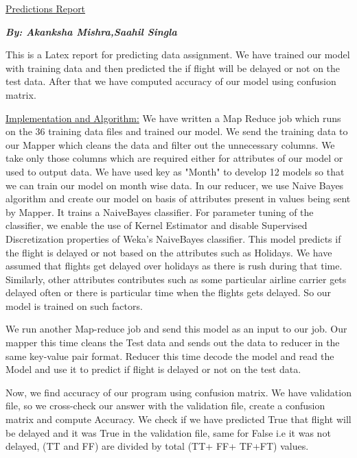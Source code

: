 \documentclass{article}
\begin{document}
\Huge
\begin{center}
\underline{Predictions Report} 
\end{center}
\vspace{1.2cm}
\textbf{\textit{
\huge{
By: 
Akanksha Mishra,Saahil Singla
}
}}

\Large{
This is a Latex report for predicting data assignment. We have trained our model with training data and then predicted the if flight will be delayed or not on the test data. After that we have computed accuracy of our model using confusion matrix. 
}
\vspace{1.2cm}

\underline{Implementation and Algorithm:}
We have written a Map Reduce job which runs on the 36 training data files and trained our model. We send the training data to our Mapper which cleans the data and filter out the unnecessary columns. We take only those columns which are required either for attributes of our model or used to output data. 
We have used key as "Month" to develop 12 models so that we can train our model on month wise data. 
In our reducer, we use Naive Bayes algorithm and create our model on basis of attributes present in values being sent by Mapper. 
It trains a NaiveBayes classifier. For parameter tuning of the classifier, we enable the use of Kernel Estimator and disable Supervised Discretization properties of Weka’s NaiveBayes classifier. This model predicts if the flight is delayed or not based on the attributes such as Holidays. We have assumed that flights get delayed over holidays as there is rush during that time. Similarly, other attributes contributes such as some particular airline carrier gets delayed often or there is particular time when the flights gets delayed. So our model is trained on such factors.

We run another Map-reduce job and send this model as an input to our job. Our mapper this time cleans the Test data and sends out the data to reducer in the same key-value pair format.
Reducer this time decode the model and read the Model and use it to predict if flight is delayed or not on the test data. 

Now, we find accuracy of our program using confusion matrix. 
We have validation file, so we cross-check our answer with the validation file, create a confusion matrix and compute Accuracy. We check if we have predicted True that flight will be delayed and it was True in the validation file, same for False i.e it was not delayed, (TT and FF) are divided by total (TT+ FF+ TF+FT) values. 
\end{document}
